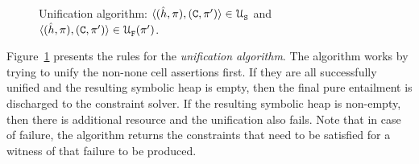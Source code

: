 \begin{figure}[t!]
{\scriptsize
\centering
{}}
\vspace*{-0.6cm}
\caption{Unification algorithm: {\small $\langle (\hat{h}, \pi), (\mathtt{C}, \pi') \rangle \in {\cal U}_{\mathtt{S}}^{}$}
and {\small $\langle (\hat{h}, \pi), (\mathtt{C}, \pi') \rangle \in {\cal U}_{\mathtt{F}}^{}(\pi')$}.\label{unification:algorithm}}
\vspace*{-0.3cm}
\end{figure}

Figure~\ref{unification:algorithm} presents the rules for the \emph{unification algorithm}. 
The algorithm works by trying to unify the non-none cell assertions first. If they are all 
successfully unified and the resulting symbolic heap is empty, then the final pure entailment 
is discharged to the constraint solver. If the resulting symbolic heap is non-empty, then there 
is additional resource and the unification also fails. Note that in case of failure, the algorithm 
returns the constraints that need to be satisfied for a witness of that failure to be produced. 

